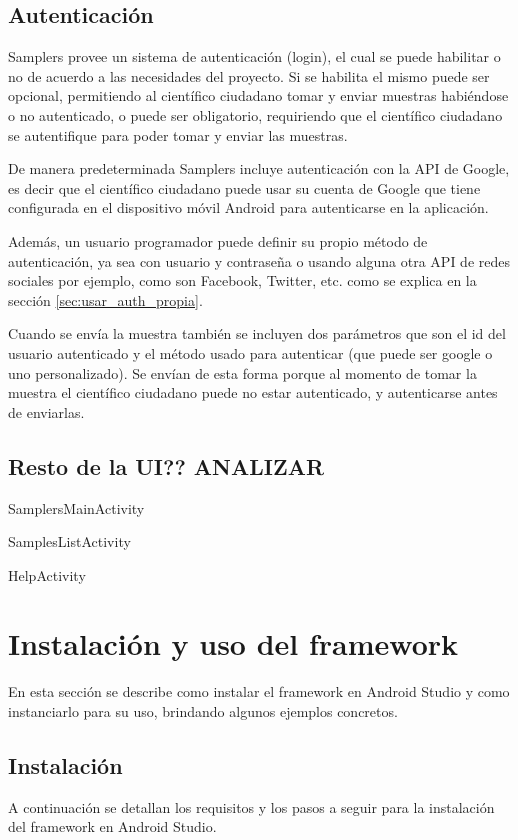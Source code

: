 \subsection{Autenticación}
Samplers provee un sistema de autenticación (login), el cual se puede habilitar o no de acuerdo a las necesidades del proyecto. Si se habilita el mismo puede ser opcional, permitiendo al científico ciudadano tomar y enviar muestras habiéndose o no autenticado, o puede ser obligatorio, requiriendo que el científico ciudadano se autentifique para poder tomar y enviar las muestras.

De manera predeterminada Samplers incluye autenticación con la API de Google, es decir que el científico ciudadano puede usar su cuenta de Google que tiene configurada en el dispositivo móvil Android para autenticarse en la aplicación.

Además, un usuario programador puede definir su propio método de autenticación, ya sea con usuario y contraseña o usando alguna otra API de redes sociales por ejemplo, como son Facebook, Twitter, etc. como se explica en la sección \ref{sec:usar_auth_propia}.

Cuando se envía la muestra también se incluyen dos parámetros que son el id del usuario autenticado y el método usado para autenticar (que puede ser google o uno personalizado). Se envían de esta forma porque al momento de tomar la muestra el científico ciudadano puede no estar autenticado, y autenticarse antes de enviarlas.

\subsection{Resto de la UI?? ANALIZAR}

SamplersMainActivity

SamplesListActivity

HelpActivity


\section{Instalación y uso del framework} \label{sec:instalacion_uso}
En esta sección se describe como instalar el framework en Android Studio y como instanciarlo para su uso, brindando algunos ejemplos concretos.

\subsection{Instalación}
A continuación se detallan los requisitos y los pasos a seguir para la instalación del framework en Android Studio.

